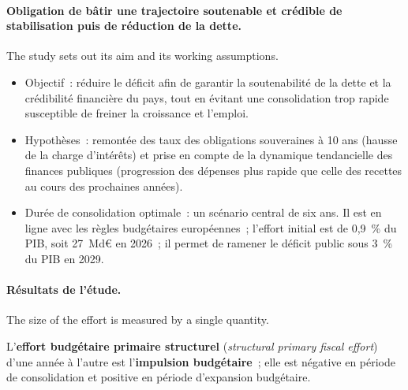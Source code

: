 \paragraph{Obligation de bâtir une trajectoire soutenable et crédible de stabilisation puis de réduction de la dette.}
The study sets out its aim and its working assumptions.
\begin{itemize}
  \item Objectif~: réduire le déficit afin de garantir la soutenabilité de la
    dette et la crédibilité financière du pays, tout en évitant une
    consolidation trop rapide susceptible de freiner la croissance et l'emploi.
  \item Hypothèses~: remontée des taux des obligations souveraines à 10 ans
    (hausse de la charge d'intérêts) et prise en compte de la dynamique
    tendancielle des finances publiques (progression des dépenses plus rapide
    que celle des recettes au cours des prochaines années).
  \item Durée de consolidation optimale~: un scénario central de six ans. Il est
    en ligne avec les règles budgétaires européennes~; l'effort initial est de
    0,9~\% du PIB, soit 27~Md€ en 2026~; il permet de ramener le déficit public
    sous 3~\% du PIB en 2029.
\end{itemize}

\paragraph{Résultats de l'étude.}
The size of the effort is measured by a single quantity.

\begin{definition}
  L'\textbf{effort budgétaire primaire structurel} (\textit{structural primary
  fiscal effort}) d'une année à l'autre est l'\textbf{impulsion budgétaire}~;
  elle est négative en période de consolidation et positive en période
  d'expansion budgétaire.
\end{definition}

